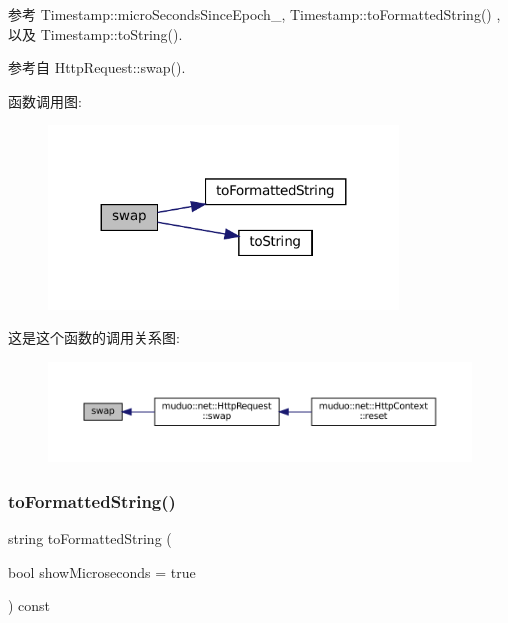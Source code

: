 参考 Timestamp\+::micro\+Seconds\+Since\+Epoch\+\_\+, Timestamp\+::to\+Formatted\+String() , 以及 Timestamp\+::to\+String().



参考自 Http\+Request\+::swap().

函数调用图\+:
\nopagebreak
\begin{figure}[H]
\begin{center}
\leavevmode
\includegraphics[width=263pt]{classmuduo_1_1Timestamp_aa405c6fb7c29a07e1924fa0b4d846638_cgraph}
\end{center}
\end{figure}
这是这个函数的调用关系图\+:
\nopagebreak
\begin{figure}[H]
\begin{center}
\leavevmode
\includegraphics[width=350pt]{classmuduo_1_1Timestamp_aa405c6fb7c29a07e1924fa0b4d846638_icgraph}
\end{center}
\end{figure}
\mbox{\label{classmuduo_1_1Timestamp_ac8bf4663993962a4d68d4a6c44588e97}} 
\subsubsection{\texorpdfstring{to\+Formatted\+String()}{toFormattedString()}}
{\footnotesize\ttfamily string to\+Formatted\+String (\begin{DoxyParamCaption}\item[{bool}]{show\+Microseconds = {\ttfamily true} }\end{DoxyParamCaption}) const}



